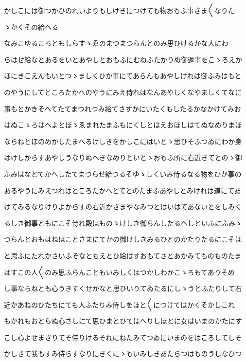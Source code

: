 \documentclass[a4paper,11pt,landscape]{ltjtarticle}
\begin{document}
\par\medskip
かしこには御つかひのれいよりもしけきにつけても物おもふ事さま〱なりた
\par\medskip
ゝかくその給へる
\par\medskip
なみこゆるころともしらすゝゑのまつまつらんとのみ思ひけるかな人にわ
\par\medskip
らはせ給なとあるをいとあやしとおもふにむねふたかりぬ御返事をこゝろえか
\par\medskip
ほにきこえんもいとつゝましくひか事にてあらんもあやしけれは御ふみはもと
\par\medskip
のやうにしてところたかへのやうにみえ侍れはなんあやしくなやましくてなに
\par\medskip
事もとかきそへてたてまつれつみ給てさすかにいたくもしたるかなかけてみお
\par\medskip
はぬこゝろはへよとほゝゑまれたまふもにくしとはえおほしはてぬなめりまほ
\par\medskip
ならねとほのめかしたまへるけしきをかしこにはいとゝ思ひそふつゐにわか身
\par\medskip
はけしからすあやしうなりぬへきなめりといとゝおもふ所に右近きてとのゝ御
\par\medskip
ふみはなとてかへしたてまつらせ給つるそゆゝしくいみ侍るなる物をひか事の
\par\medskip
あるやうにみえつれはところたかへとてとのたまふあやしとみけれは道にてあ
\par\medskip
けてみるなりけりよからすの右近かさまやなみつとはいはてあないとをしみく
\par\medskip
るしき御事ともにこそ侍れ殿はものゝけしき御らんしたるへしといふにふみゝ
\par\medskip
つらんとおもはねはことさまにてかの御けしきみるひとのかたりたるにこそは
\par\medskip
と思ふにたれかさいふそなともえとひ給はすおもてさとあかみてものものたま
\par\medskip
はすこの人〱のみ思ふらんこともいみしくはつかしわかこゝろもてありそめ
\par\medskip
し事ならねとも心うきすくせかなと思ひいりてゐたるにしゝうとふたりして右
\par\medskip
近かあねのひたちにても人ふたりみ侍しをほと〱につけてはかくそかしこれ
\par\medskip
もかれもおとらぬ心さしにて思ひまとひてはへりしほとに女はいまのかたにす
\par\medskip
こし心よせまさりてそ侍りけるそれにねたみてつゐにいまのをはころしてしそ
\par\medskip
かしさて我もすみ侍らすなりにきくにゝもいみしきあたらつはものうしなひつ
\end{document}
